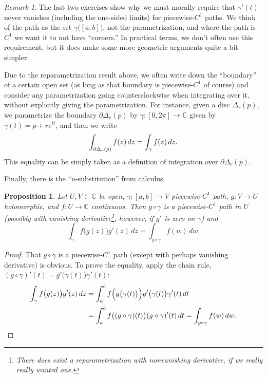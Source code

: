\documentclass[12pt,openany]{book}
\newcommand{\avoidbreak}{\postdisplaypenalty=100}
\newcommand{\C}{{\mathbb{C}}}
\newcommand{\myquote}[1]{``#1''}
\theoremstyle{plain}
\newtheorem{prop}[thm]{Proposition}
\theoremstyle{remark}
\newtheorem{remark}[thm]{Remark}
\theoremstyle{definition}
\theoremstyle{exercise}
\theoremstyle{example}
\begin{document}
\begin{remark}
The last two exercises show why we must morally
require that $\gamma'(t)$ never vanishes (including the one-sided limits)
for piecewise-$C^1$ paths.
We think of the path
as the set
$\gamma\bigl([a,b]\bigr)$,
not the parametrization, and where the path is $C^1$
we want it to not have \myquote{corners.}
In practical terms, we don't often use this requirement,
but it does make some more geometric arguments quite a bit simpler.
\end{remark}

Due to the reparametrization result above,
we often write down the \myquote{boundary} of a certain open set
(as long as that boundary is piecewise-$C^1$ of course)
and consider any parametrization going counterclockwise
when integrating over it, without explicitly giving the parametrization.
For instance, given a disc $\Delta_r(p)$, we parametrize
the boundary $\partial \Delta_r(p)$ by
$\gamma  \colon [0,2\pi] \to \C$ given by $\gamma(t) = p +
re^{it}$, and then we write
%
\begin{equation*}
\int_{\partial \Delta_r(p)} f(z) \, dz
=
\int_{\gamma} f(z) \, dz .
\avoidbreak
\end{equation*}
This equality can be simply taken as a definition of integration over
$\partial \Delta_r(p)$.

Finally, there is the \myquote{$u$-substitution} from calculus.

\begin{prop} \label{prop:usubst}
Let $U,V \subset \C$ be open, $\gamma \colon [a,b] \to V$ 
piecewise-$C^1$ path, $g \colon V \to U$ holomorphic, and $f \colon U \to \C$
continuous.  Then $g \circ \gamma$ is a piecewise-$C^1$ path in $U$
(possibly with vanishing derivative\footnote{%
There does exist a reparametrization with nonvanishing derivative, if we really
really wanted one.},
however, if $g'$ is zero on $\gamma$) and
\begin{equation*}
\int_{\gamma} f\bigl(g(z)\bigr) g'(z) \, dz
=
\int_{g \circ \gamma} f(w) \, dw .
\end{equation*}
\end{prop}

\begin{proof}
That $g \circ \gamma$ is a piecewise-$C^1$ path (except with perhaps
vanishing derivative) is obvious.  To prove the equality,
apply the chain rule,
$(g \circ \gamma)'(t) = g'\bigl(\gamma(t)\bigr) \gamma'(t)$:
\begin{equation*}
\begin{split}
\int_{\gamma} f\bigl(g(z)\bigr) g'(z) \, dz
& =
\int_a^b
f\Bigl(g\bigl(\gamma(t)\bigr)\Bigr) g'\bigl(\gamma(t)\bigr) \gamma'(t) \, dt
\\
& =
\int_a^b
f\bigl((g \circ \gamma)(t)\bigr) (g \circ \gamma)'(t) \, dt
=
\int_{g \circ \gamma} f(w) \, dw . \qedhere
\end{split}
\end{equation*}
\end{proof}
\end{document}
